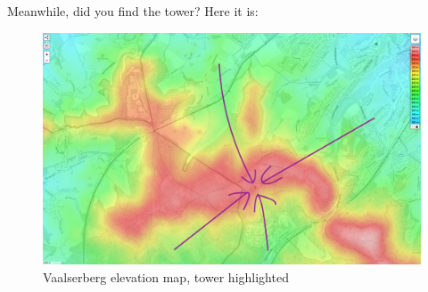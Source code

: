Meanwhile, did you find the tower? Here it is:

\begin{figure}
    \centering
    \includegraphics[width=0.8\linewidth]{images/vaalserberg_found.png}
    \caption{Vaalserberg elevation map, tower highlighted}
\end{figure}
